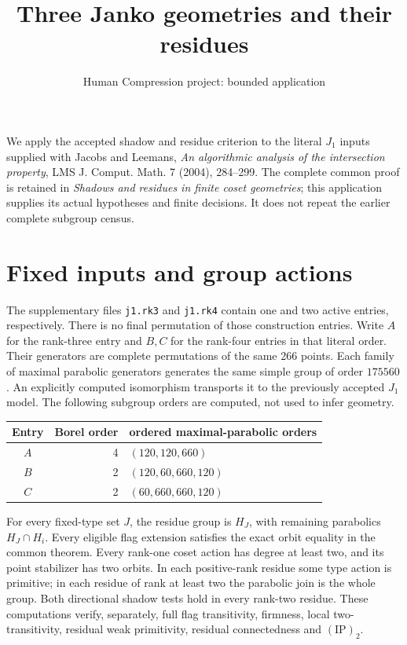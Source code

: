 \documentclass[11pt,a4paper]{article}
\title{Three Janko geometries and their residues}
\author{Human Compression project: bounded application}\date{}
\begin{document}
\maketitle
We apply the accepted shadow and residue criterion to the literal $J_1$
inputs supplied with Jacobs and Leemans, \emph{An algorithmic analysis of
the intersection property}, LMS J. Comput. Math. 7 (2004), 284--299.
The complete common proof is retained in \emph{Shadows and residues in finite
coset geometries}; this application supplies its actual hypotheses and
finite decisions. It does not repeat the earlier complete subgroup census.

\section{Fixed inputs and group actions}
The supplementary files \texttt{j1.rk3} and \texttt{j1.rk4} contain one and
two active entries, respectively. There is no final permutation of those
construction entries. Write $A$ for the rank-three entry and $B,C$ for the
rank-four entries in that literal order. Their generators are complete
permutations of the same 266 points. Each family of maximal parabolic
generators generates the same simple group of order $175560$. An explicitly
computed isomorphism transports it to the previously accepted $J_1$ model.
The following subgroup orders are computed, not used to infer geometry.
\begin{center}\begin{tabular}{crl}\toprule
Entry & Borel order & ordered maximal-parabolic orders\\\midrule
$A$&4&$(120,120,660)$\\
$B$&2&$(120,60,660,120)$\\
$C$&2&$(60,660,660,120)$\\\bottomrule
\end{tabular}\end{center}
For every fixed-type set $J$, the residue group is $H_J$, with remaining
parabolics $H_J\cap H_i$. Every eligible flag extension satisfies the exact
orbit equality in the common theorem. Every rank-one coset action has
degree at least two, and its point stabilizer has two orbits. In each
positive-rank residue some type action is primitive; in each residue of
rank at least two the parabolic join is the whole group. Both directional
shadow tests hold in every rank-two residue. These computations verify,
separately, full flag transitivity, firmness, local two-transitivity,
residual weak primitivity, residual connectedness and $(\mathrm{IP})_2$.
\end{document}
